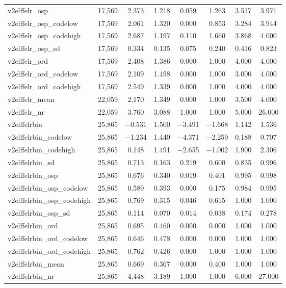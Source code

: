 \begin{table}[!htbp]
\begin{tabular}{@{\extracolsep{5pt}}lccccccc}
v2elffelr\_osp & 17,569 & 2.373 & 1.218 & 0.059 & 1.263 & 3.517 & 3.971 \\ 
v2elffelr\_osp\_codelow & 17,569 & 2.061 & 1.320 & 0.000 & 0.853 & 3.284 & 3.944 \\ 
v2elffelr\_osp\_codehigh & 17,569 & 2.687 & 1.197 & 0.110 & 1.660 & 3.868 & 4.000 \\ 
v2elffelr\_osp\_sd & 17,569 & 0.334 & 0.135 & 0.075 & 0.240 & 0.416 & 0.823 \\ 
v2elffelr\_ord & 17,569 & 2.408 & 1.386 & 0.000 & 1.000 & 4.000 & 4.000 \\ 
v2elffelr\_ord\_codelow & 17,569 & 2.109 & 1.498 & 0.000 & 1.000 & 3.000 & 4.000 \\ 
v2elffelr\_ord\_codehigh & 17,569 & 2.549 & 1.339 & 0.000 & 1.000 & 4.000 & 4.000 \\ 
v2elffelr\_mean & 22,059 & 2.170 & 1.349 & 0.000 & 1.000 & 3.500 & 4.000 \\ 
v2elffelr\_nr & 22,059 & 3.760 & 3.088 & 1.000 & 1.000 & 5.000 & 26.000 \\ 
v2elffelrbin & 25,865 & $-$0.531 & 1.500 & $-$3.491 & $-$1.668 & 1.142 & 1.536 \\ 
v2elffelrbin\_codelow & 25,865 & $-$1.234 & 1.440 & $-$4.371 & $-$2.259 & 0.188 & 0.707 \\ 
v2elffelrbin\_codehigh & 25,865 & 0.148 & 1.491 & $-$2.655 & $-$1.002 & 1.900 & 2.306 \\ 
v2elffelrbin\_sd & 25,865 & 0.713 & 0.163 & 0.219 & 0.600 & 0.835 & 0.996 \\ 
v2elffelrbin\_osp & 25,865 & 0.676 & 0.340 & 0.019 & 0.401 & 0.995 & 0.998 \\ 
v2elffelrbin\_osp\_codelow & 25,865 & 0.589 & 0.393 & 0.000 & 0.175 & 0.984 & 0.995 \\ 
v2elffelrbin\_osp\_codehigh & 25,865 & 0.769 & 0.315 & 0.046 & 0.615 & 1.000 & 1.000 \\ 
v2elffelrbin\_osp\_sd & 25,865 & 0.114 & 0.070 & 0.014 & 0.038 & 0.174 & 0.278 \\ 
v2elffelrbin\_ord & 25,865 & 0.695 & 0.460 & 0.000 & 0.000 & 1.000 & 1.000 \\ 
v2elffelrbin\_ord\_codelow & 25,865 & 0.646 & 0.478 & 0.000 & 0.000 & 1.000 & 1.000 \\ 
v2elffelrbin\_ord\_codehigh & 25,865 & 0.762 & 0.426 & 0.000 & 1.000 & 1.000 & 1.000 \\ 
v2elffelrbin\_mean & 25,865 & 0.669 & 0.367 & 0.000 & 0.400 & 1.000 & 1.000 \\ 
v2elffelrbin\_nr & 25,865 & 4.448 & 3.189 & 1.000 & 1.000 & 6.000 & 27.000 \\ 

\end{tabular}
\end{table}
